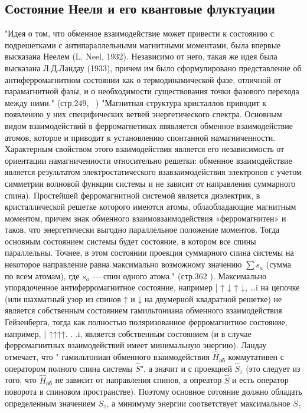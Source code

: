 \documentclass[11pt]{article}
\begin{document}
\subsection{Состояние Нееля и его квантовые флуктуации}
"Идея о том, что обменное взаимодействие может привести к состоянию с подрешетками с антипараллельными магнитными моментами, была впервые высказана Неелем (L. Neel, 1932). Независимо от него, такая же идея была высказана Л.Д.Ландау (1933), причем им было сформулировано представление об антиферромагнитном состоянии как о термодинамической фазе, отличной от парамагнитной фазы, и о необходимости существования точки фазового перехода между ними." (стр.249, ~\cite{ll_8})
"Магнитная структура кристаллов приводит к появлению у них специфических ветвей энергетического спектра. Основным видом взаимодействий в ферромагнетиках явявляется обменное взаимодействие атомов, которое и приводит к установлению спонтанной намагниченности. Характерным свойством этого взаимодействия является его независимость от ориентации намагниченности относительно решетки: обменное взаимодействие является результатом электростатического взавзаимодействия электронов с учетом симметрии волновой функции системы и не зависит от направления суммарного спина). Простейшей ферромагнитной системой является диэлектрик, в кристаллической решетке которого имеются атомы, облаобладающие магнитным моментом, причем знак обменного взаимовзаимодействия «ферромагнитен» и таков, что энергетически выгодно параллельное положение моментов. Тогда основным состоянием системы будет состояние, в котором все спины параллельны. Точнее, в этом состоянии проекция суммарного спина системы на некоторое направление равна максимально возможному значению $\sum{s_a}$ (сумма по всем атомам), где $s_a$ — спин одного атома." (стр.362 \cite{ll_8}). Максимально упорядоченное антиферромагнитное состояние, например | ↑ ↓ ↑ ↓, \dots i на цепочке (или шахматный узор из спинов ↑ и ↓ на двумерной квадратной решетке) не является собственным состоянием гамильтониана обменного взаимодействия Гейзенберга, тогда как полностью поляризованное ферромагнитное состояние, например, | ↑↑↑↑. . .i, является собственным состоянием (и в случае ферромагнитных взаимодействий имеет минимальную энергию). 
Ландау отмечает, что " гамильтониан обменного взаимодействия $\hat H_\textrm{об}$ коммутативен с оператором полного спина системы $\hat S $", а значит и с проекцией $\hat S_{z}$ (это следует из того, что $\hat H_\textrm{об}$ не зависит от направления спинов, а опреатор $\hat S$ и есть оператор поворота в спиновом пространстве). Поэтому основное сотояние должно обладать определенным значением $S_z$, а минимуму энергии соответствует максимальное $S_z$
\end{document}
